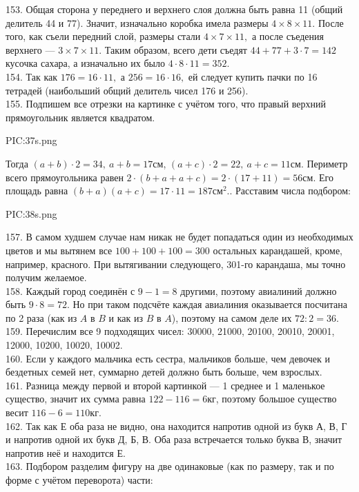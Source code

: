 153. Общая сторона у переднего и верхнего слоя должна быть равна 11 (общий делитель 44 и 77). Значит, изначально коробка имела размеры $4\times8\times11.$ После того, как съели передний слой, размеры стали $4\times7\times11,$ а после съедения верхнего --- $3\times7\times11.$ Таким образом, всего дети съедят $44+77+3\cdot7=142$ кусочка сахара, а изначально их было $4\cdot8\cdot11=352.$\\
154. Так как $176=16\cdot11,$ а $256=16\cdot16,$ ей следует купить пачки по 16 тетрадей (наибольший общий делитель чисел 176 и 256).\\
155. Подпишем все отрезки на картинке с учётом того, что правый верхний прямоугольник является квадратом.
\begin{center}
{{PIC:37s.png}}
\end{center}
Тогда $(a+b)\cdot2=34,\ a+b=17$см, $(a+c)\cdot2=22,\ a+c=11$см. Периметр всего прямоугольника равен $2\cdot(b+a+a+c)=2\cdot(17+11)=56$см. Его площадь равна $(b+a)(a+c)=17\cdot11=187\text{см}^2.$\newpage{}. Расставим числа подбором:
\begin{center}
{{PIC:38s.png}}
\end{center}
157. В самом худшем случае нам никак не будет попадаться один из необходимых цветов и мы вытянем все $100+100+100=300$ остальных карандашей, кроме, например, красного. При вытягивании следующего, 301-го карандаша, мы точно получим желаемое.\\
158. Каждый город соединён с $9-1=8$ другими, поэтому авиалиний должно быть $9\cdot8=72.$ Но при таком подсчёте каждая авиалиния оказывается посчитана по 2 раза (как из $A$ в $B$ и как из $B$ в $A$), поэтому на самом деле их $72:2=36.$\\
159. Перечислим все 9 подходящих чисел: 30000, 21000, 20100, 20010, 20001, 12000, 10200, 10020, 10002.\\
160. Если у каждого мальчика есть сестра, мальчиков больше, чем девочек и бездетных семей нет, суммарно детей должно быть больше, чем взрослых.\\
161. Разница между первой и второй картинкой --- 1 среднее и 1 маленькое существо, значит их сумма равна $122-116=6$кг, поэтому большое существо весит $116-6=110$кг.\\
162. Так как Е оба раза не видно, она находится напротив одной из букв А, В, Г и напротив одной их букв Д, Б, В. Оба раза встречается только буква В, значит напротив неё и находится Е.\\
163. Подбором разделим фигуру на две одинаковые (как по размеру, так и по форме с учётом переворота) части:

